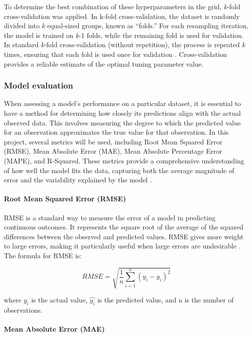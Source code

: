 \documentclass[11pt,a4paper,]{article}
\begin{document}
To determine the best combination of these hyperparameters in the grid, \emph{k}-fold cross-validation was applied. In k-fold cross-validation, the dataset is randomly divided into \emph{k} equal-sized groups, known as ``folds.'' For each resampling iteration, the model is trained on \emph{k}-1 folds, while the remaining fold is used for validation. In standard \emph{k}-fold cross-validation (without repetition), the process is repeated \emph{k} times, ensuring that each fold is used once for validation \autocite{tidymodels}. Cross-validation provides a reliable estimate of the optimal tuning parameter value.

\subsubsection{Model evaluation}\label{model-evaluation}

When assessing a model's performance on a particular dataset, it is essential to have a method for determining how closely its predictions align with the actual observed data. This involves measuring the degree to which the predicted value for an observation approximates the true value for that observation. In this project, several metrics will be used, including Root Mean Squared Error (RMSE), Mean Absolute Error (MAE), Mean Absolute Percentage Error (MAPE), and R-Squared. These metrics provide a comprehensive understanding of how well the model fits the data, capturing both the average magnitude of error and the variability explained by the model \autocite{ISLR,Hastie09}.

\paragraph{Root Mean Squared Error (RMSE)}\label{root-mean-squared-error-rmse}

RMSE is a standard way to measure the error of a model in predicting continuous outcomes. It represents the square root of the average of the squared differences between the observed and predicted values. RMSE gives more weight to large errors, making it particularly useful when large errors are undesirable \autocite{ISLR,Hastie09}. The formula for RMSE is:

\[RMSE = \sqrt{\frac{1}{n} {\sum^n_{i=1}(y_i-\hat{y_i})^2}}\]

where \(y_i\) is the actual value, \(\hat{y_i}\) is the predicted value, and n is the number of observations.

\paragraph{Mean Absolute Error (MAE)}\label{mean-absolute-error-mae}
\end{document}
